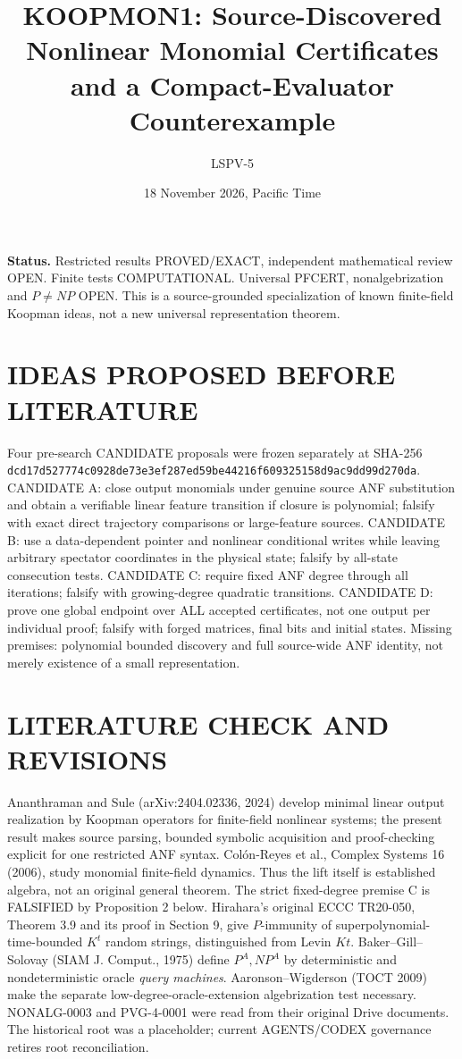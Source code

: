\documentclass[11pt]{article}
\title{KOOPMON1: Source-Discovered Nonlinear Monomial Certificates and a Compact-Evaluator Counterexample}
\author{LSPV-5}
\date{18 November 2026, Pacific Time}
\begin{document}
\maketitle
\noindent\textbf{Status.} Restricted results PROVED/EXACT, independent mathematical review OPEN. Finite tests COMPUTATIONAL. Universal PFCERT, nonalgebrization and $P\ne NP$ OPEN. This is a source-grounded specialization of known finite-field Koopman ideas, not a new universal representation theorem.

\section{IDEAS PROPOSED BEFORE LITERATURE}
Four pre-search CANDIDATE proposals were frozen separately at SHA-256 \texttt{dcd17d527774c0928de73e3ef287ed59be44216f609325158d9ac9dd99d270da}. CANDIDATE A: close output monomials under genuine source ANF substitution and obtain a verifiable linear feature transition if closure is polynomial; falsify with exact direct trajectory comparisons or large-feature sources. CANDIDATE B: use a data-dependent pointer and nonlinear conditional writes while leaving arbitrary spectator coordinates in the physical state; falsify by all-state consecution tests. CANDIDATE C: require fixed ANF degree through all iterations; falsify with growing-degree quadratic transitions. CANDIDATE D: prove one global endpoint over ALL accepted certificates, not one output per individual proof; falsify with forged matrices, final bits and initial states. Missing premises: polynomial bounded discovery and full source-wide ANF identity, not merely existence of a small representation.

\section{LITERATURE CHECK AND REVISIONS}
Ananthraman and Sule (arXiv:2404.02336, 2024) develop minimal linear output realization by Koopman operators for finite-field nonlinear systems; the present result makes source parsing, bounded symbolic acquisition and proof-checking explicit for one restricted ANF syntax. Col\'on-Reyes et al., Complex Systems 16 (2006), study monomial finite-field dynamics. Thus the lift itself is established algebra, not an original general theorem. The strict fixed-degree premise C is FALSIFIED by Proposition 2 below. Hirahara's original ECCC TR20-050, Theorem 3.9 and its proof in Section 9, give $P$-immunity of superpolynomial-time-bounded $K^t$ random strings, distinguished from Levin $Kt$. Baker--Gill--Solovay (SIAM J. Comput., 1975) define $P^A,NP^A$ by deterministic and nondeterministic oracle \emph{query machines}. Aaronson--Wigderson (TOCT 2009) make the separate low-degree-oracle-extension algebrization test necessary. NONALG-0003 and PVG-4-0001 were read from their original Drive documents. The historical root was a placeholder; current AGENTS/CODEX governance retires root reconciliation.
\end{document}
